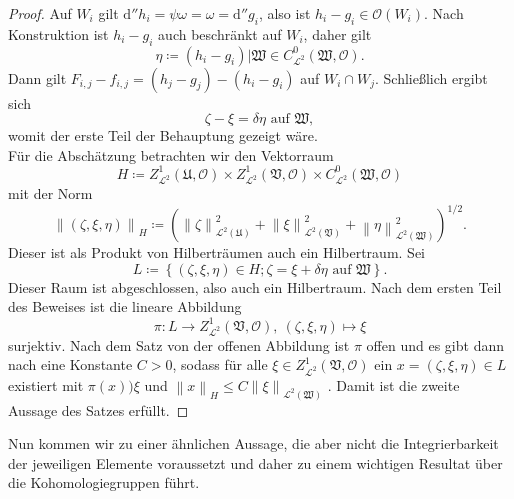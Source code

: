 \documentclass[11pt,a4paper,toc=bibliography]{scrartcl}
\theoremstyle{thm}
\theoremstyle{def}
\theoremstyle{remark}
\newcommand*{\norm}[1]{\left\lVert#1\right\rVert} %
\begin{document}
\begin{proof}
Auf $W_i$ gilt $\mathrm{d}''h_i=\psi\omega=\omega=\mathrm{d}''g_i$, also ist $h_i-g_i\in\mathcal{O}(W_i)$.
Nach Konstruktion ist $h_i-g_i$ auch beschränkt auf $W_i$, daher gilt
\[
\eta\coloneqq (h_i-g_i)|\mathfrak{W}\in C^0_{\mathcal{L}^2}(\mathfrak{W},\mathcal{O}).
\]
Dann gilt $F_{i,j}-f_{i,j}=(h_j-g_j)-(h_i-g_i)$ auf $W_i\cap W_j$. Schließlich ergibt sich
\[
\zeta-\xi=\delta\eta\text{ auf }\mathfrak{W},
\]
womit der erste Teil der Behauptung gezeigt wäre.\\
Für die Abschätzung betrachten wir den Vektorraum 
\[
H\coloneqq Z^1_{\mathcal{L}^2}(\mathfrak{U},\mathcal{O})\times Z^1_{\mathcal{L}^2}(\mathfrak{V},\mathcal{O})\times C^0_{\mathcal{L}^2}(\mathfrak{W},\mathcal{O})
\]
mit der Norm
\[
\norm{(\zeta,\xi,\eta)}_{H}\coloneqq \left( \norm{\zeta}_{\mathcal{L}^2(\mathfrak{U})}^2+\norm{\xi}_{\mathcal{L}^2(\mathfrak{V})}^2+\norm{\eta}_{\mathcal{L}^2(\mathfrak{W})}^2\right)^{1/2}.
\]
Dieser ist als Produkt von Hilberträumen auch ein Hilbertraum. Sei 
\[
L\coloneqq\left\{ (\zeta,\xi,\eta)\in H; \zeta=\xi+\delta\eta\text{ auf } \mathfrak{W}\right\}.
\]
Dieser Raum ist abgeschlossen, also auch ein Hilbertraum. Nach dem ersten Teil des Beweises ist die lineare Abbildung
\[
\pi:L\rightarrow Z^1_{\mathcal{L}^2}(\mathfrak{V},\mathcal{O}),~(\zeta,\xi,\eta)\mapsto \xi
\]
surjektiv. 
Nach dem Satz von der offenen Abbildung ist $\pi$ offen \cite[~S.168]{funkana} und es gibt dann nach \cite[~S.169]{funkana} eine Konstante $C>0$, sodass für alle $\xi\in Z^1_{\mathcal{L}^2}(\mathfrak{V},\mathcal{O})$ ein $x=(\zeta,\xi,\eta)\in L$ existiert mit $\pi(x))\xi$ und $\norm{x}_H\leq C\norm{\xi}_{\mathcal{L}^2(\mathfrak{W})}$ .
Damit ist die zweite Aussage des Satzes erfüllt.
\end{proof}
Nun kommen wir zu einer ähnlichen Aussage, die aber nicht die Integrierbarkeit der jeweiligen Elemente voraussetzt und daher zu einem wichtigen Resultat über die Kohomologiegruppen führt.
\end{document}
